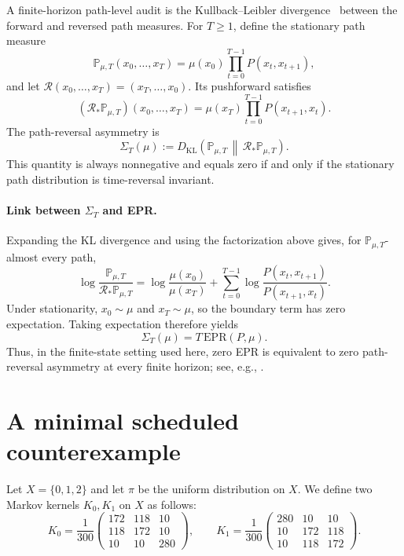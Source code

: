 \documentclass[11pt]{article}
\begin{document}
A finite-horizon path-level audit is the Kullback--Leibler divergence~\cite{kullback1951ois} between the forward and reversed path measures. For \(T\ge 1\), define the stationary path measure
\[
\mathbb{P}_{\mu,T}(x_0,\dots,x_T)=\mu(x_0)\prod_{t=0}^{T-1}P(x_t,x_{t+1}),
\]
and let \(\mathcal{R}(x_0,\dots,x_T)=(x_T,\dots,x_0)\). Its pushforward satisfies
\[
(\mathcal{R}_*\mathbb{P}_{\mu,T})(x_0,\dots,x_T)
=
\mu(x_T)\prod_{t=0}^{T-1}P(x_{t+1},x_t).
\]
The path-reversal asymmetry is
\begin{equation}\label{eq:sigmaT}
\Sigma_T(\mu):=D_{\mathrm{KL}}\!\left(\mathbb{P}_{\mu,T}\,\middle\|\,\mathcal{R}_*\mathbb{P}_{\mu,T}\right).
\end{equation}
This quantity is always nonnegative and equals zero if and only if the stationary path distribution is time-reversal invariant.

\paragraph{Link between \(\Sigma_T\) and EPR.}
Expanding the KL divergence and using the factorization above gives, for \(\mathbb{P}_{\mu,T}\)-almost every path,
\[
\log\frac{\mathbb{P}_{\mu,T}}{\mathcal{R}_*\mathbb{P}_{\mu,T}}
=
\log\frac{\mu(x_0)}{\mu(x_T)}
+
\sum_{t=0}^{T-1}\log\frac{P(x_t,x_{t+1})}{P(x_{t+1},x_t)}.
\]
Under stationarity, \(x_0\sim \mu\) and \(x_T\sim \mu\), so the boundary term has zero expectation. Taking expectation therefore yields
\begin{equation}\label{eq:sigmaT_epr}
\Sigma_T(\mu)=T\,\mathrm{EPR}(P,\mu).
\end{equation}
Thus, in the finite-state setting used here, zero EPR is equivalent to zero path-reversal asymmetry at every finite horizon; see, e.g., \cite{roldan2012kld,gaspard2004trde,seifert2012st}.
 \section{A minimal scheduled counterexample}\label{sec:minimal}

Let \(X=\{0,1,2\}\) and let \(\pi\) be the uniform distribution on \(X\).
We define two Markov kernels \(K_0,K_1\) on \(X\) as follows:
\[
K_0=\frac{1}{300}\begin{pmatrix}
172 & 118 & 10\\
118 & 172 & 10\\
10  & 10  & 280
\end{pmatrix},
\qquad
K_1=\frac{1}{300}\begin{pmatrix}
280 & 10  & 10\\
10  & 172 & 118\\
10  & 118 & 172
\end{pmatrix}.
\]
 
\end{document}
